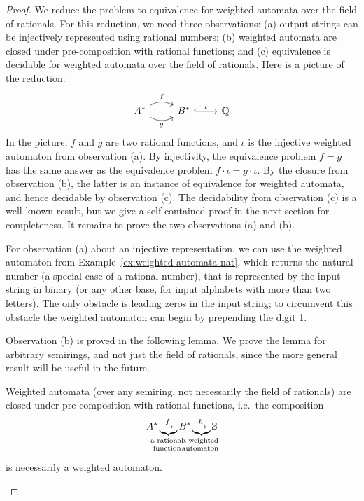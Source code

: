 \begin{proof}
    We reduce the problem to equivalence for weighted automata over the field of rationals. For this reduction, we need three observations: (a) output strings can be injectively represented using rational numbers; (b) weighted automata are closed under pre-composition with rational functions; and (c) equivalence is decidable for weighted automata over the field of rationals. Here is a picture of the reduction: 
    \[
    \begin{tikzcd}
    A^* 
    \arrow[r,"f", bend left]
    \arrow[r,"g"', bend right]
    &
    B^* 
    \arrow[r,hookrightarrow, "\iota"]
    &
    \Rat
    \end{tikzcd}
    \]
    In the picture, $f$ and $g$ are two rational functions, and $\iota$ is the injective weighted automaton from observation (a). By injectivity, the equivalence problem $f=g$ has the same answer as the equivalence problem $f \cdot \iota = g \cdot \iota$. By the closure from observation (b), the latter is an instance of equivalence for weighted automata, and hence decidable by observation (c).
    The decidability from observation (c) is a well-known result, but we give a self-contained proof in the next section for completeness.
    It remains to prove the two observations (a) and (b).

    For observation (a) about an injective representation, we can use the weighted automaton from Example~\ref{ex:weighted-automata-nat}, which returns the natural number (a special case of a rational number), that is represented by the input string in binary (or any other base, for input alphabets with more than two letters). The only obstacle is leading zeros in the input string; to circumvent this obstacle the weighted automaton can begin by prepending the digit 1. 

    Observation (b) is proved in the following lemma. We prove the lemma for arbitrary semirings, and not just the field of rationals, since the more general result will be useful in the future.
    \begin{lemma}\label{lem:closure-weighted-automata-precomposition}
        Weighted automata (over any semiring, not necessarily the field of rationals) are closed under pre-composition with rational functions, i.e.~the composition 
        \begin{align*}
        A^*
        \myunderbrace{\xrightarrow{f}}{a rational \\ function}
        B^*
        \myunderbrace{\xrightarrow{h}}{a weighted \\ automaton}
        \semiring
        \end{align*}
        is necessarily a weighted automaton.
    \end{lemma}


\end{proof}
